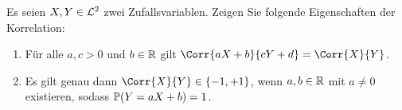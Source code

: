\begin{exercisePage}
	
	\begin{homework}
		Es seien $X,Y \in \L^2$ zwei Zufallsvariablen. Zeigen Sie folgende Eigenschaften der Korrelation:
		\begin{enumerate}[nolistsep]
			\item Für alle $a,c > 0$ und $b \in \R$ gilt $\Corr{aX+b}{cY+d} = \Corr{X}{Y}$.
			\item Es gilt genau dann $\Corr{X}{Y} \in \menge{-1,+1}$, wenn $a,b \in \R$ mit $a \neq 0$ existieren, sodass $\P(Y = aX+b) = 1$.
		\end{enumerate}
	\end{homework}

	\newcommand{\wurzel}{\sqrt{\frac{\Var[Y]}{\Var[X]}}}
	\newcommand{\bruch}{\frac{\Var[Y]}{\Var[X]}}
	

\end{exercisePage}
